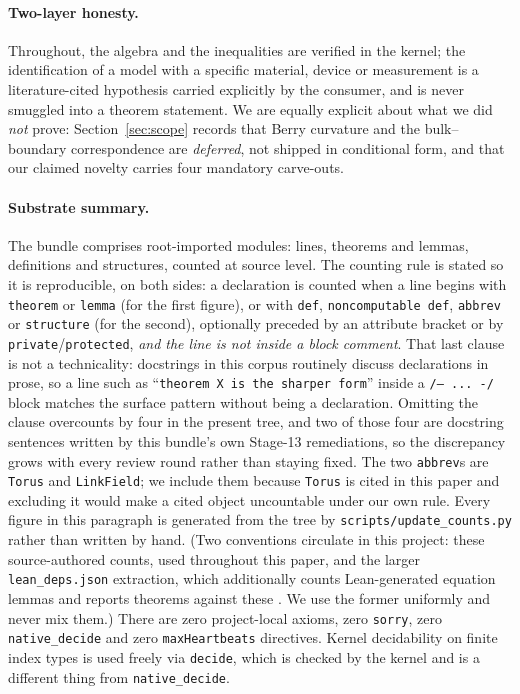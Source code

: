 \documentclass[aps,prb,reprint,nofootinbib,superscriptaddress]{revtex4-2}
\newcommand{\thm}[1]{{\def\_{\char`\_\allowbreak}\texttt{#1}}}
\begin{document}
\paragraph{Two-layer honesty.} Throughout, the algebra and the inequalities are verified in the
kernel; the identification of a model with a specific material, device or measurement is a
literature-cited hypothesis carried explicitly by the consumer, and is never smuggled into a theorem
statement. We are equally explicit about what we did \emph{not} prove: Section~\ref{sec:scope}
records that Berry curvature and the bulk--boundary correspondence are \emph{deferred}, not shipped
in conditional form, and that our claimed novelty carries four mandatory carve-outs.

\paragraph{Substrate summary.} The bundle comprises \dxiModules{} root-imported modules: \dxiLines{} lines, \dxiTheorems{} theorems and lemmas, \dxiDefs{} definitions and structures,
counted at source level. The counting rule is stated so it is reproducible, on both sides: a
declaration is counted when a line begins with \texttt{theorem} or \texttt{lemma} (for the first
figure), or with \texttt{def}, \texttt{noncomputable def}, \texttt{abbrev} or \texttt{structure}
(for the second), optionally preceded by an attribute bracket or by
\texttt{private}/\texttt{protected}, \emph{and the line is not inside a block comment}. That last
clause is not a technicality: docstrings in this corpus routinely discuss declarations in prose, so a
line such as ``\texttt{theorem X is the sharper form}'' inside a \texttt{/-- ... -/} block matches
the surface pattern without being a declaration. Omitting the clause overcounts by four in the
present tree, and two of those four are docstring sentences written by this bundle's own
Stage-13 remediations, so the discrepancy grows with every review round rather than staying fixed. The two \texttt{abbrev}s are \thm{Torus} and
\thm{LinkField}; we include them because \thm{Torus} is cited in this paper and excluding it would
make a cited object uncountable under our own rule. Every figure in this paragraph is generated
from the tree by \texttt{scripts/update\_counts.py} rather than written by hand.
(Two conventions circulate in this project: these source-authored counts, used throughout this paper,
and the larger \texttt{lean\_deps.json} extraction, which additionally counts Lean-generated
equation lemmas and reports \dxiDepsTheorems{} theorems against these \dxiTheorems{}. We use the
former uniformly and never mix them.) There are
zero project-local axioms, zero
\texttt{sorry}, zero \texttt{native\_decide} and zero \texttt{maxHeartbeats} directives. Kernel
decidability on finite index types is used freely via \texttt{decide}, which is checked by the kernel
and is a different thing from \texttt{native\_decide}.
\end{document}
